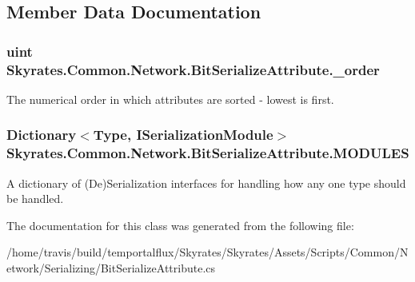 \subsection{Member Data Documentation}
\hypertarget{class_skyrates_1_1_common_1_1_network_1_1_bit_serialize_attribute_afad634aa4c413a98c22d0b26d7dad8a6}{
\subsubsection[{\-\_\-order}]{\setlength{\rightskip}{0pt plus 5cm}uint Skyrates.\-Common.\-Network.\-Bit\-Serialize\-Attribute.\-\_\-order}}\label{class_skyrates_1_1_common_1_1_network_1_1_bit_serialize_attribute_afad634aa4c413a98c22d0b26d7dad8a6}


The numerical order in which attributes are sorted -\/ lowest is first. 

\hypertarget{class_skyrates_1_1_common_1_1_network_1_1_bit_serialize_attribute_a5804be2d376111418f81ec041b5ddf80}{
\subsubsection[{M\-O\-D\-U\-L\-E\-S}]{\setlength{\rightskip}{0pt plus 5cm}Dictionary$<$Type, {\bf I\-Serialization\-Module}$>$ Skyrates.\-Common.\-Network.\-Bit\-Serialize\-Attribute.\-M\-O\-D\-U\-L\-E\-S\hspace{0.3cm}{\ttfamily [static]}}}\label{class_skyrates_1_1_common_1_1_network_1_1_bit_serialize_attribute_a5804be2d376111418f81ec041b5ddf80}


A dictionary of (De)Serialization interfaces for handling how any one type should be handled. 



The documentation for this class was generated from the following file\-:\begin{DoxyCompactItemize}
\item 
/home/travis/build/temportalflux/\-Skyrates/\-Skyrates/\-Assets/\-Scripts/\-Common/\-Network/\-Serializing/Bit\-Serialize\-Attribute.\-cs\end{DoxyCompactItemize}
